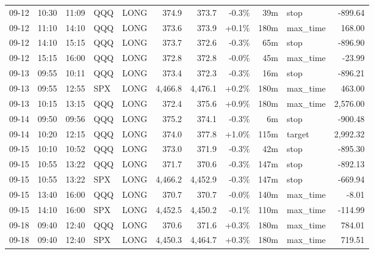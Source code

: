 \documentclass[11pt,a4paper,twoside]{article}
\begin{document}
\begin{center}
\begin{longtable}{>{\color{txtmain}}l l l l l r r r r >{\color{txtmain}}l r}
09-12 & 10:30 & 11:09 & QQQ & LONG & 374.9 & 373.7 & \textcolor{lossred}{-0.3\%} & 39m & stop & \textcolor{lossred}{-899.64} \\
09-12 & 11:10 & 14:10 & QQQ & LONG & 373.6 & 373.9 & \textcolor{wingreen}{+0.1\%} & 180m & max\_time & \textcolor{wingreen}{168.00} \\
09-12 & 14:10 & 15:15 & QQQ & LONG & 373.7 & 372.6 & \textcolor{lossred}{-0.3\%} & 65m & stop & \textcolor{lossred}{-896.90} \\
09-12 & 15:15 & 16:00 & QQQ & LONG & 372.8 & 372.8 & \textcolor{lossred}{-0.0\%} & 45m & max\_time & \textcolor{lossred}{-23.99} \\
09-13 & 09:55 & 10:11 & QQQ & LONG & 373.4 & 372.3 & \textcolor{lossred}{-0.3\%} & 16m & stop & \textcolor{lossred}{-896.21} \\
09-13 & 09:55 & 12:55 & SPX & LONG & 4,466.8 & 4,476.1 & \textcolor{wingreen}{+0.2\%} & 180m & max\_time & \textcolor{wingreen}{463.00} \\
09-13 & 10:15 & 13:15 & QQQ & LONG & 372.4 & 375.6 & \textcolor{wingreen}{+0.9\%} & 180m & max\_time & \textcolor{wingreen}{2,576.00} \\
09-14 & 09:50 & 09:56 & QQQ & LONG & 375.2 & 374.1 & \textcolor{lossred}{-0.3\%} & 6m & stop & \textcolor{lossred}{-900.48} \\
09-14 & 10:20 & 12:15 & QQQ & LONG & 374.0 & 377.8 & \textcolor{wingreen}{+1.0\%} & 115m & target & \textcolor{wingreen}{2,992.32} \\
09-15 & 10:10 & 10:52 & QQQ & LONG & 373.0 & 371.9 & \textcolor{lossred}{-0.3\%} & 42m & stop & \textcolor{lossred}{-895.30} \\
09-15 & 10:55 & 13:22 & QQQ & LONG & 371.7 & 370.6 & \textcolor{lossred}{-0.3\%} & 147m & stop & \textcolor{lossred}{-892.13} \\
09-15 & 10:55 & 13:22 & SPX & LONG & 4,466.2 & 4,452.9 & \textcolor{lossred}{-0.3\%} & 147m & stop & \textcolor{lossred}{-669.94} \\
09-15 & 13:40 & 16:00 & QQQ & LONG & 370.7 & 370.7 & \textcolor{lossred}{-0.0\%} & 140m & max\_time & \textcolor{lossred}{-8.01} \\
09-15 & 14:10 & 16:00 & SPX & LONG & 4,452.5 & 4,450.2 & \textcolor{lossred}{-0.1\%} & 110m & max\_time & \textcolor{lossred}{-114.99} \\
09-18 & 09:40 & 12:40 & QQQ & LONG & 370.6 & 371.6 & \textcolor{wingreen}{+0.3\%} & 180m & max\_time & \textcolor{wingreen}{784.01} \\
09-18 & 09:40 & 12:40 & SPX & LONG & 4,450.3 & 4,464.7 & \textcolor{wingreen}{+0.3\%} & 180m & max\_time & \textcolor{wingreen}{719.51} \\

\end{longtable}
\end{center}
\end{document}
